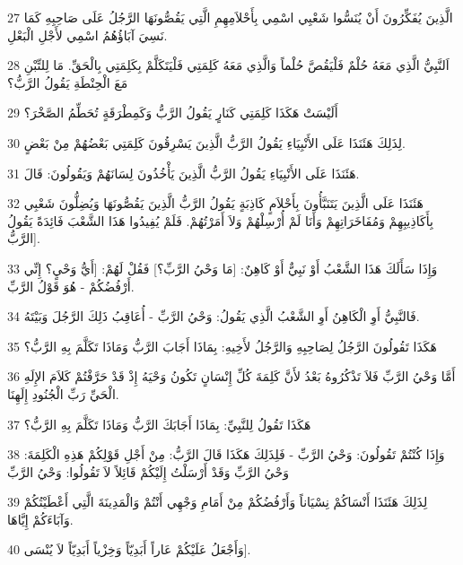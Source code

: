 \par 27 الَّذِينَ يُفَكِّرُونَ أَنْ يُنَسُّوا شَعْبِي اسْمِي بِأَحْلاَمِهِمِ الَّتِي يَقُصُّونَهَا الرَّجُلُ عَلَى صَاحِبِهِ كَمَا نَسِيَ آبَاؤُهُمُ اسْمِي لأَجْلِ الْبَعْلِ.
\par 28 اَلنَّبِيُّ الَّذِي مَعَهُ حُلْمٌ فَلْيَقُصَّ حُلْماً وَالَّذِي مَعَهُ كَلِمَتِي فَلْيَتَكَلَّمْ بِكَلِمَتِي بِالْحَقِّ. مَا لِلتِّبْنِ مَعَ الْحِنْطَةِ يَقُولُ الرَّبُّ؟
\par 29 أَلَيْسَتْ هَكَذَا كَلِمَتِي كَنَارٍ يَقُولُ الرَّبُّ وَكَمِطْرَقَةٍ تُحَطِّمُ الصَّخْرَ؟
\par 30 لِذَلِكَ هَئَنَذَا عَلَى الأَنْبِيَاءِ يَقُولُ الرَّبُّ الَّذِينَ يَسْرِقُونَ كَلِمَتِي بَعْضُهُمْ مِنْ بَعْضٍ.
\par 31 هَئَنَذَا عَلَى الأَنْبِيَاءِ يَقُولُ الرَّبُّ الَّذِينَ يَأْخُذُونَ لِسَانَهُمْ وَيَقُولُونَ: قَالَ.
\par 32 هَئَنَذَا عَلَى الَّذِينَ يَتَنَبَّأُونَ بِأَحْلاَمٍ كَاذِبَةٍ يَقُولُ الرَّبُّ الَّذِينَ يَقُصُّونَهَا وَيُضِلُّونَ شَعْبِي بِأَكَاذِيبِهِمْ وَمُفَاخَرَاتِهِمْ وَأَنَا لَمْ أُرْسِلْهُمْ وَلاَ أَمَرْتُهُمْ. فَلَمْ يُفِيدُوا هَذَا الشَّعْبَ فَائِدَةً يَقُولُ الرَّبُّ].
\par 33 وَإِذَا سَأَلَكَ هَذَا الشَّعْبُ أَوْ نَبِيٌّ أَوْ كَاهِنٌ: [مَا وَحْيُ الرَّبِّ؟] فَقُلْ لَهُمْ: [أَيُّ وَحْيٍ؟ إِنِّي أَرْفُضُكُمْ - هُوَ قَوْلُ الرَّبِّ.
\par 34 فَالنَّبِيُّ أَوِ الْكَاهِنُ أَوِ الشَّعْبُ الَّذِي يَقُولُ: وَحْيُ الرَّبِّ - أُعَاقِبُ ذَلِكَ الرَّجُلَ وَبَيْتَهُ.
\par 35 هَكَذَا تَقُولُونَ الرَّجُلُ لِصَاحِبِهِ وَالرَّجُلُ لأَخِيهِ: بِمَاذَا أَجَابَ الرَّبُّ وَمَاذَا تَكَلَّمَ بِهِ الرَّبُّ؟
\par 36 أَمَّا وَحْيُ الرَّبِّ فَلاَ تَذْكُرُوهُ بَعْدُ لأَنَّ كَلِمَةَ كُلِّ إِنْسَانٍ تَكُونُ وَحْيَهُ إِذْ قَدْ حَرَّفْتُمْ كَلاَمَ الإِلَهِ الْحَيِّ رَبِّ الْجُنُودِ إِلَهِنَا.
\par 37 هَكَذَا تَقُولُ لِلنَّبِيِّ: بِمَاذَا أَجَابَكَ الرَّبُّ وَمَاذَا تَكَلَّمَ بِهِ الرَّبُّ؟
\par 38 وَإِذَا كُنْتُمْ تَقُولُونَ: وَحْيُ الرَّبِّ - فَلِذَلِكَ هَكَذَا قَالَ الرَّبُّ: مِنْ أَجْلِ قَوْلِكُمْ هَذِهِ الْكَلِمَةَ: وَحْيُ الرَّبِّ وَقَدْ أَرْسَلْتُ إِلَيْكُمْ قَائِلاً لاَ تَقُولُوا: وَحْيُ الرَّبِّ
\par 39 لِذَلِكَ هَئَنَذَا أَنْسَاكُمْ نِسْيَاناً وَأَرْفُضُكُمْ مِنْ أَمَامِ وَجْهِي أَنْتُمْ وَالْمَدِينَةَ الَّتِي أَعْطَيْتُكُمْ وَآبَاءَكُمْ إِيَّاهَا.
\par 40 وَأَجْعَلُ عَلَيْكُمْ عَاراً أَبَدِيّاً وَخِزْياً أَبَدِيّاً لاَ يُنْسَى].

